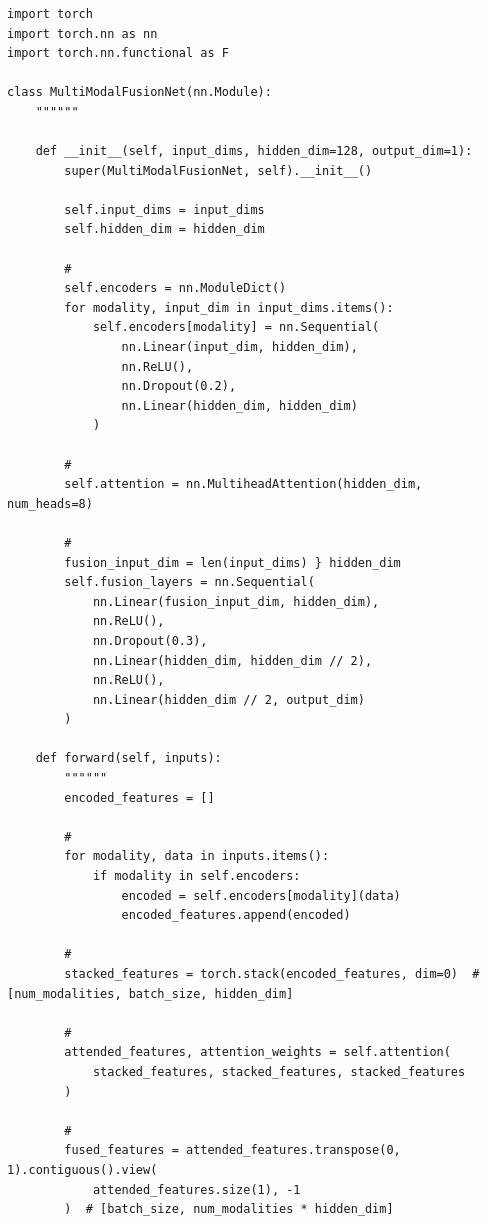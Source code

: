 \hypertarget{section-98}{%
\subsubsection{}\label{section-98}}

\begin{lstlisting}[style=python]
import torch
import torch.nn as nn
import torch.nn.functional as F

class MultiModalFusionNet(nn.Module):
    """"""
    
    def __init__(self, input_dims, hidden_dim=128, output_dim=1):
        super(MultiModalFusionNet, self).__init__()
        
        self.input_dims = input_dims
        self.hidden_dim = hidden_dim
        
        # 
        self.encoders = nn.ModuleDict()
        for modality, input_dim in input_dims.items():
            self.encoders[modality] = nn.Sequential(
                nn.Linear(input_dim, hidden_dim),
                nn.ReLU(),
                nn.Dropout(0.2),
                nn.Linear(hidden_dim, hidden_dim)
            )
        
        # 
        self.attention = nn.MultiheadAttention(hidden_dim, num_heads=8)
        
        # 
        fusion_input_dim = len(input_dims) } hidden_dim
        self.fusion_layers = nn.Sequential(
            nn.Linear(fusion_input_dim, hidden_dim),
            nn.ReLU(),
            nn.Dropout(0.3),
            nn.Linear(hidden_dim, hidden_dim // 2),
            nn.ReLU(),
            nn.Linear(hidden_dim // 2, output_dim)
        )
    
    def forward(self, inputs):
        """"""
        encoded_features = []
        
        # 
        for modality, data in inputs.items():
            if modality in self.encoders:
                encoded = self.encoders[modality](data)
                encoded_features.append(encoded)
        
        # 
        stacked_features = torch.stack(encoded_features, dim=0)  # [num_modalities, batch_size, hidden_dim]
        
        # 
        attended_features, attention_weights = self.attention(
            stacked_features, stacked_features, stacked_features
        )
        
        # 
        fused_features = attended_features.transpose(0, 1).contiguous().view(
            attended_features.size(1), -1
        )  # [batch_size, num_modalities * hidden_dim]
        

\end{lstlisting}
